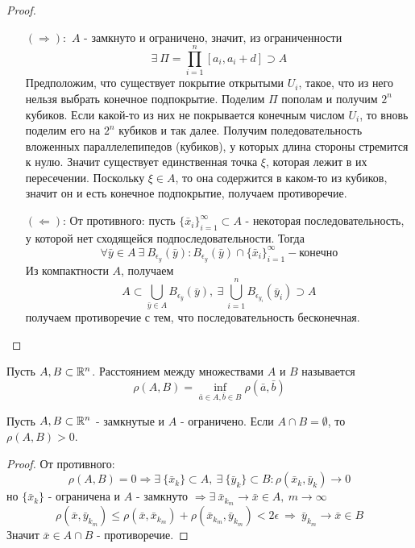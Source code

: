 \begin{proof}\tab
    \begin{itemize}
        \item[$(\Rightarrow):$] $A$ - замкнуто и ограничено, значит, из ограниченности
        \[\exists\ \Pi=\prod\limits_{i=1}^{n}[a_i, a_i+d]\supset A\] 
        Предположим, что существует покрытие открытыми $U_i$, такое, что из него нельзя выбрать конечное подпокрытие. Поделим $\Pi$ пополам и получим $2^n$ кубиков. Если какой-то из них не покрывается конечным числом $U_i$, то вновь поделим его на $2^n$ кубиков и так далее. Получим поледовательность вложенных параллелепипедов (кубиков), у которых длина стороны стремится к нулю. Значит существует единственная точка $\xi$, которая лежит в их пересечении. Поскольку $\xi \in A$, то она содержится в каком-то из кубиков, значит он и есть конечное подпокрытие, получаем противоречие. 
        \item[$(\Leftarrow)$:] От противного: пусть $\{\bar{x}_i\}_{i=1}^{\infty}\subset A$ - некоторая последовательность, у которой нет сходящейся подпоследовательности. Тогда 
        \[\forall \bar{y}\in A\ \exists\ B_{\epsilon_y}(\bar{y}): B_{\epsilon_y}(\bar{y})\cap \{\bar{x}_i\}_{i=1}^{\infty} - \text{конечно}\]
        Из компактности $A$, получаем
        \[A\subset \bigcup_{\bar{y}\in A}B_{\epsilon_{\bar{y}}}(\bar{y}),\ \exists\ \bigcup_{i=1}^n B_{\epsilon_{y_i}}(\bar{y}_i)\supset A\]
        получаем противоречие с тем, что последовательность бесконечная.
    \end{itemize}
\end{proof} 
\begin{definition}
    Пусть $A,B\subset \mathbb{R}^n$. Расстоянием между множествами $A$ и $B$ называется 
    \[\rho(A,B)=\inf\limits_{\bar{a}\in A,\bar{b}\in B}\rho(\bar{a}, \bar{b})\]
\end{definition} 
\begin{theorem}
    Пусть $A,B \subset \mathbb{R}^n$ - замкнутые и $A$ - ограничено. Если $A\cap B=\emptyset$, то $\rho(A,B)>0$. 
\end{theorem} 
\begin{proof}
    От противного:
    \[\rho(A,B)=0 \Rightarrow \exists\ \{\bar{x}_k\}\subset A,\ \exists\ \{\bar{y}_k\}\subset B: \rho(\bar{x}_k, \bar{y}_k)\to 0\] 
    но $\{\bar{x}_k\}$ - ограничена и $A$ - замкнуто $\Rightarrow \exists\ \bar{x}_{k_m}\to \bar{x}\in A,\ m\to \infty$
    \[\rho(\bar{x}, \bar{y}_{k_m})\leq \rho(\bar{x}, \bar{x}_{k_m})+\rho(\bar{x}_{k_m}, \bar{y}_{k_m})<2\epsilon\ \Rightarrow\ \bar{y}_{k_m}\to \bar{x}\in B\]
    Значит $\bar{x}\in A\cap B$ - противоречие.
\end{proof}

